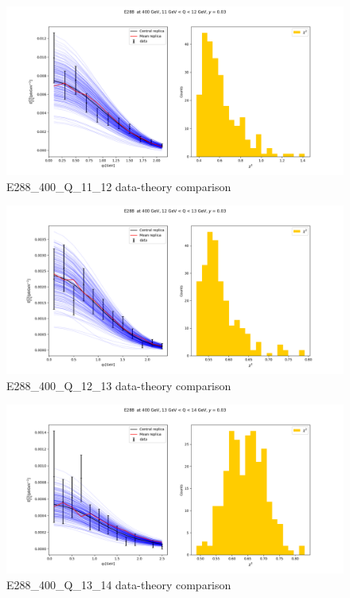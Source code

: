 \documentclass[
]{article}
\begin{document}
\begin{figure}
\centering
\includegraphics{pngplots/E288_400_Q_11_12.png}
\caption{E288\_400\_Q\_11\_12 data-theory comparison}
\end{figure}

\begin{figure}
\centering
\includegraphics{pngplots/E288_400_Q_12_13.png}
\caption{E288\_400\_Q\_12\_13 data-theory comparison}
\end{figure}

\begin{figure}
\centering
\includegraphics{pngplots/E288_400_Q_13_14.png}
\caption{E288\_400\_Q\_13\_14 data-theory comparison}
\end{figure}
\end{document}
